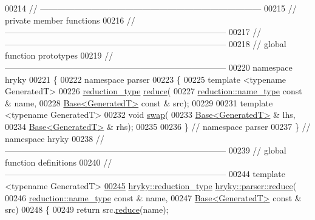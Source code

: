 \begin{DoxyCode}
00214 \textcolor{comment}{//
      ------------------------------------------------------------------------------}
00215 \textcolor{comment}{// private member functions}
00216 \textcolor{comment}{//
      ------------------------------------------------------------------------------}
00217 \textcolor{comment}{//
      ------------------------------------------------------------------------------}
00218 \textcolor{comment}{// global function prototypes}
00219 \textcolor{comment}{//
      ------------------------------------------------------------------------------}
00220 \textcolor{keyword}{namespace }hryky
00221 \{
00222 \textcolor{keyword}{namespace }parser
00223 \{
00225     \textcolor{keyword}{template} <\textcolor{keyword}{typename} GeneratedT>
00226     \hyperlink{classhryky_1_1_intrusive_ptr}{reduction_type} \hyperlink{namespacehryky_1_1parser_a41d3abfe59948313b274c24612cfcbf2}{reduce}(
00227         \hyperlink{classhryky_1_1reduction_1_1_string}{reduction::name_type} \textcolor{keyword}{const} & name,
00228         \hyperlink{classhryky_1_1parser_1_1_base}{Base<GeneratedT>} \textcolor{keyword}{const} & src);
00229 
00231     \textcolor{keyword}{template} <\textcolor{keyword}{typename} GeneratedT>
00232     \textcolor{keywordtype}{void} \hyperlink{namespacehryky_1_1parser_acbeac181da6c2a9f92e921f9133cfa8f}{swap}(
00233         \hyperlink{classhryky_1_1parser_1_1_base}{Base<GeneratedT>} & lhs,
00234         \hyperlink{classhryky_1_1parser_1_1_base}{Base<GeneratedT>} & rhs);
00235 
00236 \} \textcolor{comment}{// namespace parser}
00237 \} \textcolor{comment}{// namespace hryky}
00238 \textcolor{comment}{//
      ------------------------------------------------------------------------------}
00239 \textcolor{comment}{// global function definitions}
00240 \textcolor{comment}{//
      ------------------------------------------------------------------------------}
00244 \textcolor{comment}{}\textcolor{keyword}{template} <\textcolor{keyword}{typename} GeneratedT>
\hypertarget{parser__base_8h_source_l00245}{}\hyperlink{namespacehryky_1_1parser_a41d3abfe59948313b274c24612cfcbf2}{00245} \hyperlink{classhryky_1_1_intrusive_ptr}{hryky::reduction_type} \hyperlink{namespacehryky_1_1parser_a41d3abfe59948313b274c24612cfcbf2}{hryky::parser::reduce}(
00246     \hyperlink{classhryky_1_1reduction_1_1_string}{reduction::name_type} \textcolor{keyword}{const} & name,
00247     \hyperlink{classhryky_1_1parser_1_1_base}{Base<GeneratedT>} \textcolor{keyword}{const} & src)
00248 \{
00249     \textcolor{keywordflow}{return} src.\hyperlink{classhryky_1_1parser_1_1_base_a2809ad5f75abd2266e6804e90094bc05}{reduce}(name);

\end{DoxyCode}
